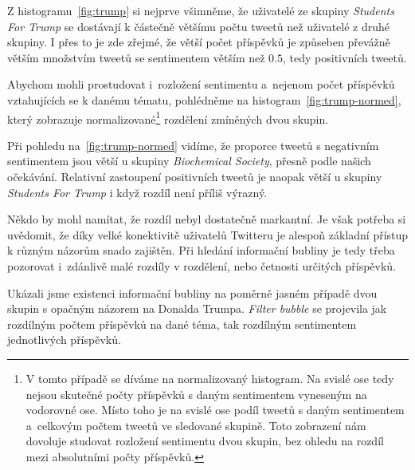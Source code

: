 \documentclass[12pt, a4paper]{article}
\numberwithin{equation}{section} 	%
\begin{document}
Z histogramu~\autoref{fig:trump} si nejprve všimněme, že uživatelé ze skupiny \textit{Students For Trump} se dostávají k částečně většímu počtu tweetů než uživatelé z druhé skupiny. I přes to je zde zřejmé, že větší počet příspěvků je způseben převážně větším množstvím tweetů se sentimentem větším než $0.5$, tedy positivních tweetů.

Abychom mohli prostudovat i~rozložení sentimentu a~nejenom počet příspěvků vztahujících se k danému tématu, pohlédněme na histogram~\autoref{fig:trump-normed}, který zobrazuje normalizované\footnote{V tomto případě se díváme na normalizovaný histogram. Na svislé ose tedy nejsou skutečné počty příspěvků s daným sentimentem vyneseným na vodorovné ose. Místo toho je na svislé ose podíl tweetů s daným sentimentem a~celkovým počtem tweetů ve sledované skupině. Toto zobrazení nám dovoluje studovat rozložení sentimentu dvou skupin, bez ohledu na rozdíl mezi absolutními počty příspěvků.} rozdělení zmíněných dvou skupin.

Při pohledu na~\autoref{fig:trump-normed} vidíme, že proporce tweetů s negativním sentimentem jsou větší u skupiny \textit{Biochemical Society}, přesně podle našich očekávání. Relativní zastoupení positivních tweetů je naopak větší u skupiny \textit{Students For Trump} i když rozdíl není příliš výrazný.

Někdo by mohl namítat, že rozdíl nebyl dostatečně markantní. Je však potřeba si uvědomit, že díky velké konektivitě uživatelů Twitteru je alespoň základní přístup k různým názorům snado zajištěn. Při hledání informační bubliny je tedy třeba pozorovat i~zdánlivě malé rozdíly v rozdělení, nebo četnosti určitých příspěvků.

Ukázali jsme existenci informační bubliny na poměrně jasném případě dvou skupin s opačným názorem na Donalda Trumpa. \textit{Filter bubble} se projevila jak rozdílným počtem příspěvků na dané téma, tak rozdílným sentimentem jednotlivých příspěvků.
\end{document}
